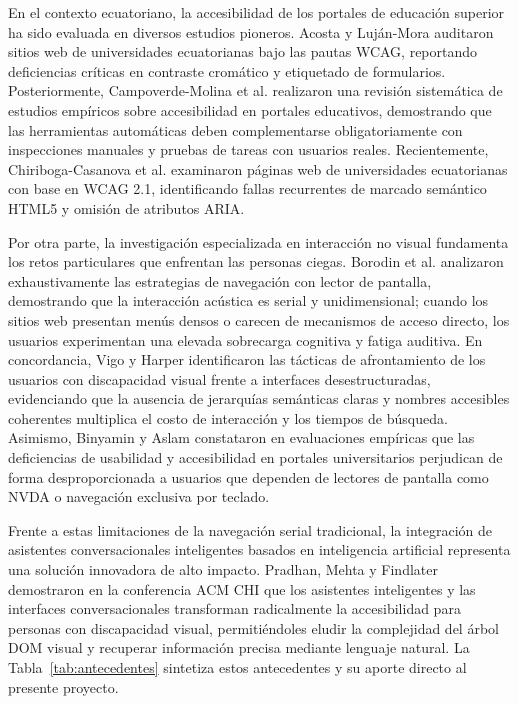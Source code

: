 En el contexto ecuatoriano, la accesibilidad de los portales de educación superior ha sido evaluada en diversos estudios pioneros. Acosta y Luján-Mora \cite{acosta2017analisis} auditaron sitios web de universidades ecuatorianas bajo las pautas WCAG, reportando deficiencias críticas en contraste cromático y etiquetado de formularios. Posteriormente, Campoverde-Molina et al. \cite{campoverde2020empirical} realizaron una revisión sistemática de estudios empíricos sobre accesibilidad en portales educativos, demostrando que las herramientas automáticas deben complementarse obligatoriamente con inspecciones manuales y pruebas de tareas con usuarios reales. Recientemente, Chiriboga-Casanova et al. \cite{chiriboga2024accessibility} examinaron páginas web de universidades ecuatorianas con base en WCAG 2.1, identificando fallas recurrentes de marcado semántico HTML5 y omisión de atributos ARIA.

Por otra parte, la investigación especializada en interacción no visual fundamenta los retos particulares que enfrentan las personas ciegas. Borodin et al. \cite{borodin2010more} analizaron exhaustivamente las estrategias de navegación con lector de pantalla, demostrando que la interacción acústica es serial y unidimensional; cuando los sitios web presentan menús densos o carecen de mecanismos de acceso directo, los usuarios experimentan una elevada sobrecarga cognitiva y fatiga auditiva. En concordancia, Vigo y Harper \cite{vigo2013coping} identificaron las tácticas de afrontamiento de los usuarios con discapacidad visual frente a interfaces desestructuradas, evidenciando que la ausencia de jerarquías semánticas claras y nombres accesibles coherentes multiplica el costo de interacción y los tiempos de búsqueda. Asimismo, Binyamin y Aslam \cite{binyamin2024accessibility} constataron en evaluaciones empíricas que las deficiencias de usabilidad y accesibilidad en portales universitarios perjudican de forma desproporcionada a usuarios que dependen de lectores de pantalla como NVDA o navegación exclusiva por teclado.

Frente a estas limitaciones de la navegación serial tradicional, la integración de asistentes conversacionales inteligentes basados en inteligencia artificial representa una solución innovadora de alto impacto. Pradhan, Mehta y Findlater \cite{pradhan2018accessibility} demostraron en la conferencia ACM CHI que los asistentes inteligentes y las interfaces conversacionales transforman radicalmente la accesibilidad para personas con discapacidad visual, permitiéndoles eludir la complejidad del árbol DOM visual y recuperar información precisa mediante lenguaje natural. La Tabla~\ref{tab:antecedentes} sintetiza estos antecedentes y su aporte directo al presente proyecto.

